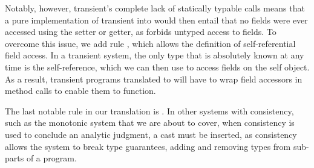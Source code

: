 \documentclass[a4paper,USenglish]{tex/lipics-v2016}
\begin{document}
\begin{mathpar}





\end{mathpar}

Notably, however, transient's complete lack of statically typable calls means that a pure implementation of transient into \kafka would then entail that no fields were ever accessed using the setter or getter, as \kafka forbids untyped access to fields. To overcome this issue, we add rule , which allows the definition of self-referential field access. In a transient system, the only type that is absolutely known at any time is the self-reference, which we can then use to access fields on the self object. As a result, transient programs translated to \kafka will have to wrap field accessors in method calls to enable them to function.

\begin{mathpar}

\end{mathpar}

The last notable rule in our translation is . In other systems with consistency, such as the monotonic system that we are about to cover, when consistency is used to conclude an analytic judgment, a cast must be inserted, as consistency allows the system to break type guarantees, adding and removing types from sub-parts of a program.
\end{document}
